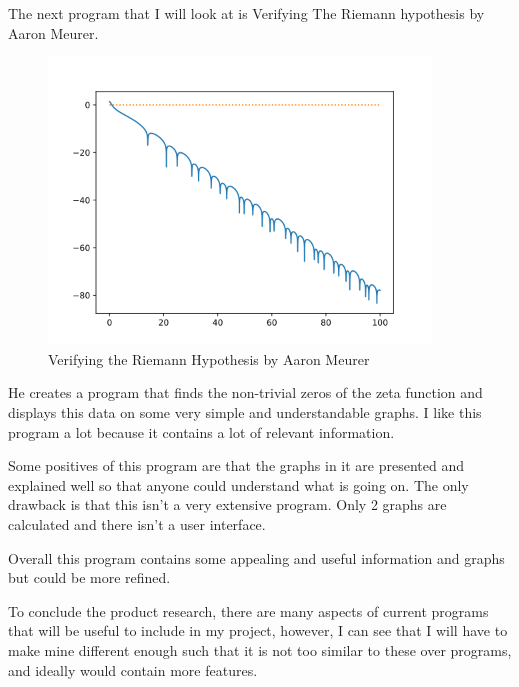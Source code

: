 \documentclass[12pt]{article}
\begin{document}
\clearpage
The next program that I will look at is Verifying The Riemann hypothesis by Aaron Meurer.

\begin{figure}[ht]
    \centering
    \captionsetup{justification=centering}
    \includegraphics[width=4in]{verifying-riemann-hypothesis}
    \caption{Verifying the Riemann Hypothesis by Aaron Meurer}
\end{figure}

He creates a program that finds the non-trivial zeros of the zeta function and displays this data on some very simple and understandable graphs. I like this program a lot because it contains a lot of relevant information.

Some positives of this program are that the graphs in it are presented and explained well so that anyone could understand what is going on. The only drawback is that this isn't a very extensive program. Only 2 graphs are calculated and there isn't a user interface.

Overall this program contains some appealing and useful information and graphs but could be more refined.

To conclude the product research, there are many aspects of current programs that will be useful to include in my project, however, I can see that I will have to make mine different enough such that it is not too similar to these over programs, and ideally would contain more features.
\clearpage
\end{document}
